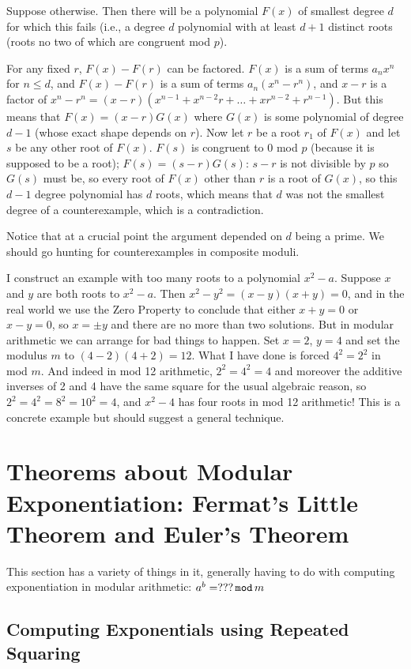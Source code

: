 \documentclass[12pt]{article}
\begin{document}
Suppose otherwise.  Then there will be a polynomial $F(x)$ of smallest degree $d$ for which this fails (i.e., a degree $d$ polynomial with at least $d+1$ distinct roots (roots no two of which are congruent mod $p$).

For any fixed $r$, $F(x)-F(r)$ can be factored.  $F(x)$ is a sum of terms $a_nx^n$ for $n \leq d$,
and $F(x)-F(r)$ is a sum of terms $a_n(x^n-r^n)$, and $x-r$ is a factor of $x^n-r^n = (x-r)(x^{n-1}+x^{n-2}r+\ldots+xr^{n-2}+ r^{n-1})$.  But this means that $F(x)=(x-r)G(x)$ where $G(x)$
is some polynomial of degree $d-1$ (whose exact shape depends on $r$).  Now let $r$ be a root $r_1$ of $F(x)$ and let $s$ be any other root of $F(x)$.  $F(s)$ is congruent to 0 mod $p$ (because it is supposed to be a root);
$F(s) = (s-r)G(s)$:  $s-r$ is not divisible by $p$ so $G(s)$ must be, so every root of $F(x)$ other than $r$
is a root of $G(x)$, so this $d-1$ degree polynomial has $d$ roots, which means that $d$ was not the smallest degree of a counterexample, which is a contradiction.

Notice that at a crucial point the argument depended on $d$ being a prime.   We should go hunting for counterexamples in composite moduli.

I construct an example with too many roots to a polynomial $x^2-a$.   Suppose $x$ and $y$ are both roots to
$x^2-a$.  Then $x^2-y^2=(x-y)(x+y)=0$, and in the real world we use the Zero Property to conclude that either
$x+y=0$ or $x-y=0$, so $x=\pm y$ and there are no more than two solutions.  But in modular arithmetic we can arrange for bad things to happen.   Set $x=2$, $y=4$ and set the modulus $m$ to $(4-2)(4+2)=12$.   What I have done is forced
$4^2=2^2$ in mod $m$.  And indeed in mod 12 arithmetic, $2^2=4^2=4$ and moreover the additive inverses of 2
and 4 have the same square for the usual algebraic reason, so $2^2=4^2=8^2=10^2=4$, and $x^2-4$ has four roots in mod 12 arithmetic!   This is a concrete example but should suggest a general technique.




\section{Theorems about Modular Exponentiation:  Fermat's Little Theorem and Euler's Theorem}

This section has a variety of things in it, generally having to do with computing exponentiation in modular arithmetic:   $a^b=???\,{\tt mod}\,m$

\subsection{Computing Exponentials using Repeated Squaring}
\end{document}
